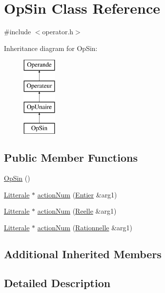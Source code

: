 \hypertarget{class_op_sin}{}\section{Op\+Sin Class Reference}
\label{class_op_sin}


{\ttfamily \#include $<$operator.\+h$>$}

Inheritance diagram for Op\+Sin\+:\begin{figure}[H]
\begin{center}
\leavevmode
\includegraphics[height=4.000000cm]{class_op_sin}
\end{center}
\end{figure}
\subsection*{Public Member Functions}
\begin{DoxyCompactItemize}
\item 
\hyperlink{class_op_sin_a12a0bac6c20d8f2956da28ed588062f1}{Op\+Sin} ()
\item 
\hyperlink{class_litterale}{Litterale} $\ast$ \hyperlink{class_op_sin_a9812e69009b3d29a25a05bbf2c4929ec}{action\+Num} (\hyperlink{class_entier}{Entier} \&arg1)
\item 
\hyperlink{class_litterale}{Litterale} $\ast$ \hyperlink{class_op_sin_a090eb911b7778adc6a5870552d2b0316}{action\+Num} (\hyperlink{class_reelle}{Reelle} \&arg1)
\item 
\hyperlink{class_litterale}{Litterale} $\ast$ \hyperlink{class_op_sin_af7975968a1981c55822561caa8a470be}{action\+Num} (\hyperlink{class_rationnelle}{Rationnelle} \&arg1)
\end{DoxyCompactItemize}
\subsection*{Additional Inherited Members}


\subsection{Detailed Description}


